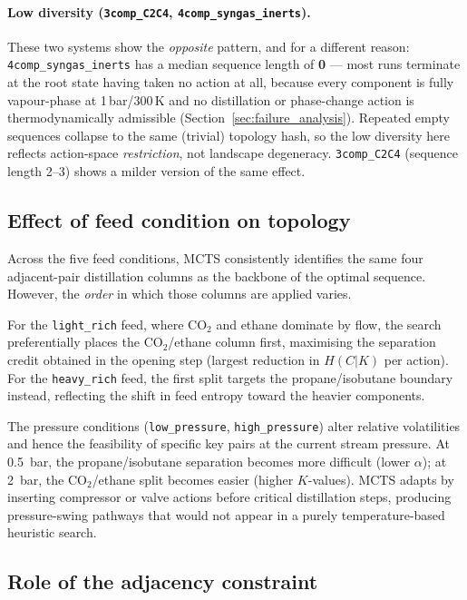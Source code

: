 \documentclass[11pt,a4paper]{article}
\theoremstyle{definition}
\theoremstyle{plain}
\begin{document}
\paragraph{Low diversity (\texttt{3comp\_C2C4},
\texttt{4comp\_syngas\_inerts}).}
These two systems show the \emph{opposite} pattern, and for a different reason: \texttt{4comp\_syngas\_inerts} has a median sequence length of \textbf{0} — most runs terminate at the root state having taken no action at all, because every component is fully vapour-phase at 1\,bar/300\,K and no distillation or phase-change action is thermodynamically admissible (Section~\ref{sec:failure_analysis}). Repeated empty sequences collapse to the same (trivial) topology hash, so the low diversity here reflects action-space
\emph{restriction}, not landscape degeneracy.
\texttt{3comp\_C2C4} (sequence length 2--3) shows a milder version of the same effect.
\label{sec:discussion}

\subsection{Effect of feed condition on topology}

Across the five feed conditions, MCTS consistently identifies the same four adjacent-pair distillation columns as the backbone of the optimal sequence. However, the \emph{order} in which those columns are applied varies.

For the \texttt{light\_rich} feed, where CO$_2$ and ethane dominate by flow, the search preferentially places the CO$_2$/ethane column first, maximising the separation credit obtained in the opening step (largest reduction in $H(C|K)$ per action). For the \texttt{heavy\_rich} feed, the first split targets the propane/isobutane boundary instead, reflecting the shift in feed entropy toward the heavier components.

The pressure conditions (\texttt{low\_pressure}, \texttt{high\_pressure}) alter relative volatilities and hence the feasibility of specific key pairs at the current stream pressure. At 0.5~bar, the propane/isobutane separation becomes more difficult (lower $\alpha$); at 2~bar, the CO$_2$/ethane split becomes easier (higher $K$-values). MCTS adapts by inserting compressor or valve actions before critical distillation steps, producing pressure-swing pathways that would not appear in a purely temperature-based heuristic search.

\subsection{Role of the adjacency constraint}
\end{document}
